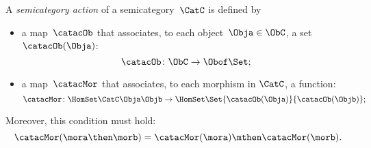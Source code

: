 \begin{ctdefinition}
	\label{def:semicategory-action}
	A \emph{semicategory action} of a semicategory~$\CatC$ is defined by
	\begin{itemize}
		\item a map~$\catacOb$ that associates, to each object~$\Obja \in \ObC$, a set~$\catacOb(\Obja)$:
		      \begin{equation}
			      \catacOb \colon \ObC \to \Obof\Set;
		      \end{equation}
		\item a map~$\catacMor$ that associates, to each morphism in $\CatC$, a function:
		      \begin{equation}
			      \catacMor\colon \HomSet\CatC\Obja\Objb \to  \HomSet\Set{\catacOb(\Obja)}{\catacOb(\Objb) };
		      \end{equation}
	\end{itemize}
	Moreover, this condition must hold:
	\begin{equation}
		\catacMor(\mora\then\morb) = \catacMor(\mora) \mthen \catacMor(\morb).
	\end{equation}
\end{ctdefinition}

